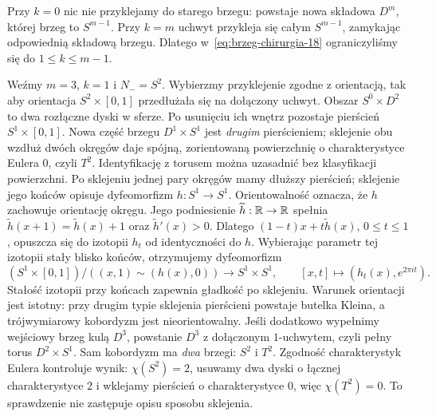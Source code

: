 \begin{uwaga}
Przy $k=0$ nic nie przyklejamy do starego
brzegu: powstaje nowa składowa $D^m$,
której brzeg to $S^{m-1}$. Przy $k=m$
uchwyt przykleja się całym $S^{m-1}$,
zamykając odpowiednią składową brzegu.
Dlatego w~\eqref{eq:brzeg-chirurgia-18}
ograniczyliśmy się do $1\leq k\leq m-1$.
\end{uwaga}

\begin{przyklad}
\label{prz:sfera-torus-chirurgia-18}
Weźmy $m=3$, $k=1$ i $N_-=S^2$.
Wybierzmy przyklejenie zgodne z orientacją,
tak aby orientacja $S^2\times[0,1]$ przedłużała się
na dołączony uchwyt.
Obszar $S^0\times D^2$ to dwa rozłączne
dyski w sferze. Po usunięciu ich wnętrz
pozostaje pierścień $S^1\times[0,1]$.
Nowa część brzegu $D^1\times S^1$
jest \emph{drugim} pierścieniem; sklejenie
obu wzdłuż dwóch okręgów daje spójną, zorientowaną
powierzchnię o charakterystyce Eulera $0$, czyli $T^2$.
Identyfikację z torusem można uzasadnić bez klasyfikacji powierzchni.
Po sklejeniu jednej pary okręgów mamy dłuższy pierścień;
sklejenie jego końców opisuje dyfeomorfizm $h:S^1\to S^1$.
Orientowalność oznacza, że $h$ zachowuje orientację okręgu.
Jego podniesienie $\widetilde h:\mathbb{R}\to\mathbb{R}$ spełnia
$\widetilde h(x+1)=\widetilde h(x)+1$ oraz $\widetilde h'(x)>0$.
Dlatego $(1-t)x+t\widetilde h(x)$, $0\leq t\leq1$,
opuszcza się do izotopii $h_t$ od identyczności do $h$.
Wybierając parametr tej izotopii stały blisko końców,
otrzymujemy dyfeomorfizm
\[
 (S^1\times[0,1])/((x,1)\sim(h(x),0))\longrightarrow S^1\times S^1,
 \qquad [x,t]\longmapsto(h_t(x),e^{2\pi it}).
\]
Stałość izotopii przy końcach zapewnia gładkość po sklejeniu.
Warunek orientacji jest istotny: przy drugim typie
sklejenia pierścieni powstaje butelka Kleina,
a trójwymiarowy kobordyzm jest nieorientowalny.
Jeśli dodatkowo wypełnimy wejściowy brzeg
kulą $D^3$, powstanie $D^3$ z dołączonym
$1$-uchwytem, czyli pełny torus $D^2\times S^1$.
Sam kobordyzm ma \emph{dwa} brzegi: $S^2$ i $T^2$.
Zgodność charakterystyk Eulera kontroluje
wynik: $\chi(S^2)=2$, usuwamy dwa dyski
o łącznej charakterystyce $2$ i wklejamy
pierścień o charakterystyce $0$, więc
$\chi(T^2)=0$. To sprawdzenie nie zastępuje
opisu sposobu sklejenia.
\end{przyklad}

